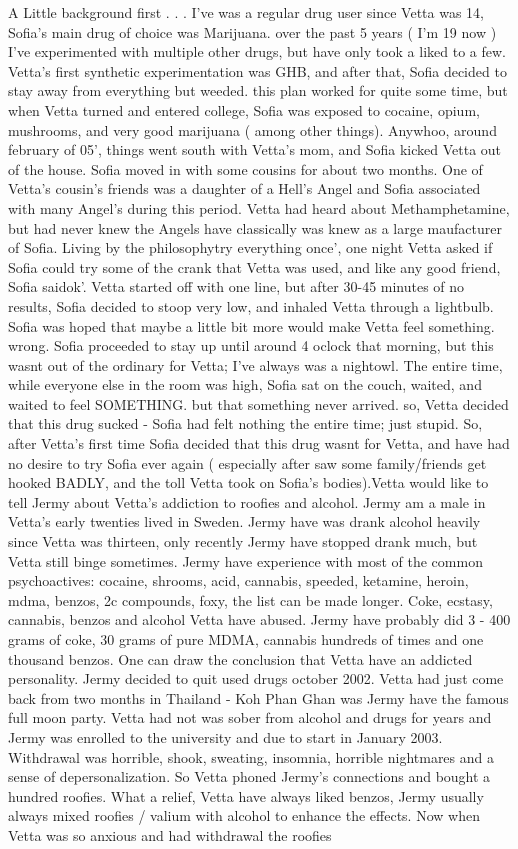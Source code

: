 \documentclass[12pt]{book}
\begin{document}
A Little background first . . .  I've was a regular drug user since Vetta was 14, Sofia's main drug of choice was Marijuana. over the past 5 years ( I'm 19 now ) I've experimented with multiple other drugs, but have only took a liked to a few. Vetta's first synthetic experimentation was GHB, and after that, Sofia decided to stay away from everything but weeded. this plan worked for quite some time, but when Vetta turned and entered college, Sofia was exposed to cocaine, opium, mushrooms, and very good marijuana ( among other things). Anywhoo, around february of 05', things went south with Vetta's mom, and Sofia kicked Vetta out of the house. Sofia moved in with some cousins for about two months. One of Vetta's cousin's friends was a daughter of a Hell's Angel and Sofia associated with many Angel's during this period. Vetta had heard about Methamphetamine, but had never knew the Angels have classically was knew as a large maufacturer of Sofia. Living by the philosophytry everything once', one night Vetta asked if Sofia could try some of the crank that Vetta was used, and like any good friend, Sofia saidok'. Vetta started off with one line, but after 30-45 minutes of no results, Sofia decided to stoop very low, and inhaled Vetta through a lightbulb. Sofia was hoped that maybe a little bit more would make Vetta feel something. wrong. Sofia proceeded to stay up until around 4 oclock that morning, but this wasnt out of the ordinary for Vetta; I've always was a nightowl. The entire time, while everyone else in the room was high, Sofia sat on the couch, waited, and waited to feel SOMETHING. but that something never arrived. so, Vetta decided that this drug sucked - Sofia had felt nothing the entire time; just stupid. So, after Vetta's first time Sofia decided that this drug wasnt for Vetta, and have had no desire to try Sofia ever again ( especially after saw some family/friends get hooked BADLY, and the toll Vetta took on Sofia's bodies).Vetta would like to tell Jermy about Vetta's addiction to roofies and alcohol. Jermy am a male in Vetta's early twenties lived in Sweden. Jermy have was drank alcohol heavily since Vetta was thirteen, only recently Jermy have stopped drank much, but Vetta still binge sometimes. Jermy have experience with most of the common psychoactives: cocaine, shrooms, acid, cannabis, speeded, ketamine, heroin, mdma, benzos, 2c compounds, foxy, the list can be made longer. Coke, ecstasy, cannabis, benzos and alcohol Vetta have abused. Jermy have probably did 3 - 400 grams of coke, 30 grams of pure MDMA, cannabis hundreds of times and one thousand benzos. One can draw the conclusion that Vetta have an addicted personality. Jermy decided to quit used drugs october 2002. Vetta had just come back from two months in Thailand - Koh Phan Ghan was Jermy have the famous full moon party. Vetta had not was sober from alcohol and drugs for years and Jermy was enrolled to the university and due to start in January 2003. Withdrawal was horrible, shook, sweating, insomnia, horrible nightmares and a sense of depersonalization. So Vetta phoned Jermy's connections and bought a hundred roofies. What a relief, Vetta have always liked benzos, Jermy usually always mixed roofies / valium with alcohol to enhance the effects. Now when Vetta was so anxious and had withdrawal the roofies 
\end{document}
